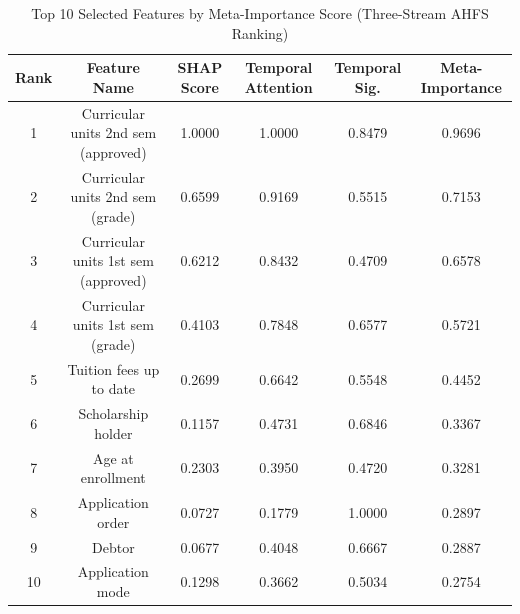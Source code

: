 \begin{table}[t]
\centering
\caption{Top 10 Selected Features by Meta-Importance Score (Three-Stream AHFS Ranking)}
\label{tab:feature_selection_real}
\small
\begin{tabular}{cccccc}
\toprule
\textbf{Rank} & \textbf{Feature Name} & \textbf{SHAP Score} & \textbf{Temporal Attention} & \textbf{Temporal Sig.} & \textbf{Meta-Importance} \\
\midrule
1 & Curricular units 2nd sem (approved) & 1.0000 & 1.0000 & 0.8479 & 0.9696 \\
2 & Curricular units 2nd sem (grade) & 0.6599 & 0.9169 & 0.5515 & 0.7153 \\
3 & Curricular units 1st sem (approved) & 0.6212 & 0.8432 & 0.4709 & 0.6578 \\
4 & Curricular units 1st sem (grade) & 0.4103 & 0.7848 & 0.6577 & 0.5721 \\
5 & Tuition fees up to date & 0.2699 & 0.6642 & 0.5548 & 0.4452 \\
6 & Scholarship holder & 0.1157 & 0.4731 & 0.6846 & 0.3367 \\
7 & Age at enrollment & 0.2303 & 0.3950 & 0.4720 & 0.3281 \\
8 & Application order & 0.0727 & 0.1779 & 1.0000 & 0.2897 \\
9 & Debtor & 0.0677 & 0.4048 & 0.6667 & 0.2887 \\
10 & Application mode & 0.1298 & 0.3662 & 0.5034 & 0.2754 \\
\bottomrule
\end{tabular}
\end{table}